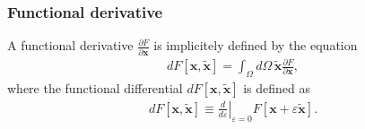 \begin{frame}

\end{frame}

\begin{frame}
  \frametitle{Functional derivative}
  A functional derivative  $\frac{\partial F}{\partial\mathbf{x}}$ is implicitely defined by the equation
  \begin{align*}
    dF\left[\mathbf{x},\tilde{\mathbf{x}}\right]=\int_{\Omega}d\Omega\,\tilde{\mathbf{x}}\frac{\partial F}{\partial\mathbf{x}},
  \end{align*}
  where the functional differential $dF\left[\mathbf{x},\tilde{\mathbf{x}}\right]$ is defined as
  \begin{align*}
    dF\left[\mathbf{x},\tilde{\mathbf{x}}\right]\equiv\left.\frac{d}{d\varepsilon}\right|_{\varepsilon=0}F\left[\mathbf{x}+\varepsilon\tilde{\mathbf{x}}\right].
  \end{align*}
\end{frame}
